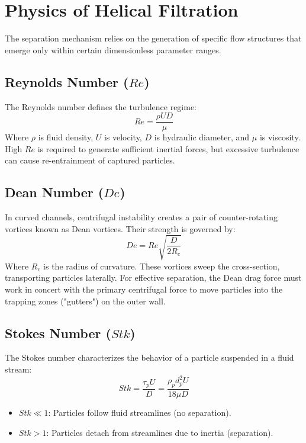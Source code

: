 \documentclass[twocolumn]{article}
\begin{document}
\section{Physics of Helical Filtration}

The separation mechanism relies on the generation of specific flow structures that emerge only within certain dimensionless parameter ranges.

\subsection{Reynolds Number ($Re$)}
The Reynolds number defines the turbulence regime:
\begin{equation}
Re = \frac{\rho U D}{\mu}
\end{equation}
Where $\rho$ is fluid density, $U$ is velocity, $D$ is hydraulic diameter, and $\mu$ is viscosity. High $Re$ is required to generate sufficient inertial forces, but excessive turbulence can cause re-entrainment of captured particles.

\subsection{Dean Number ($De$)}
In curved channels, centrifugal instability creates a pair of counter-rotating vortices known as Dean vortices. Their strength is governed by:
\begin{equation}
De = Re \sqrt{\frac{D}{2R_c}}
\end{equation}
Where $R_c$ is the radius of curvature. These vortices sweep the cross-section, transporting particles laterally. For effective separation, the Dean drag force must work in concert with the primary centrifugal force to move particles into the trapping zones ("gutters") on the outer wall.

\subsection{Stokes Number ($Stk$)}
The Stokes number characterizes the behavior of a particle suspended in a fluid stream:
\begin{equation}
Stk = \frac{\tau_p U}{D} = \frac{\rho_p d_p^2 U}{18 \mu D}
\end{equation}
\begin{itemize}
    \item $Stk \ll 1$: Particles follow fluid streamlines (no separation).
    \item $Stk > 1$: Particles detach from streamlines due to inertia (separation).
\end{itemize}
\end{document}
